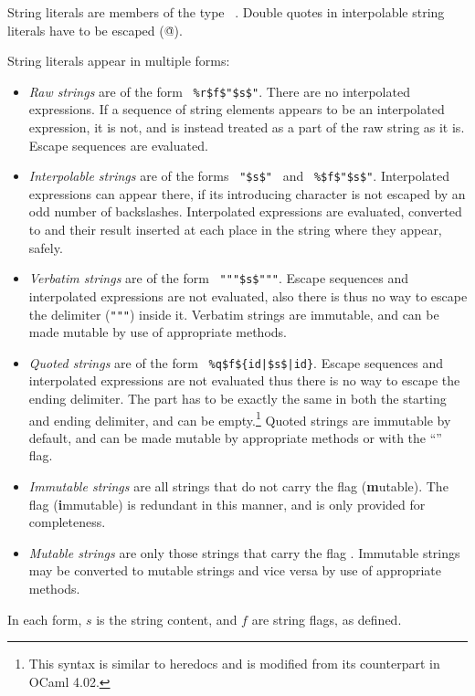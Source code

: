 String literals are members of the type ~\lstinline@String@. Double quotes in interpolable string literals have to be escaped (\lstinline@\"@).

String literals appear in multiple forms:
\begin{itemize}
  \item {\em Raw strings} are of the form ~\lstinline!%r$f$"$s$"!. There are no interpolated expressions. If a sequence of string elements appears to be an interpolated expression, it is not, and is instead treated as a part of the raw string as it is. Escape sequences are evaluated. 
  \item {\em Interpolable strings} are of the forms ~\lstinline!"$s$"!~ and ~\lstinline!%$f$"$s$"!. Interpolated expressions can appear there, if its introducing character is not escaped by an odd number of backslashes. Interpolated expressions are evaluated, converted to  and their result inserted at each place in the string where they appear, safely. 
  \item {\em Verbatim strings} are of the form ~\lstinline!"""$s$"""!. Escape sequences and interpolated expressions are not evaluated, also there is thus no way to escape the delimiter (\lstinline!"""!) inside it. Verbatim strings are immutable, and can be made mutable by use of appropriate methods. 
  \item {\em Quoted strings} are of the form ~\lstinline!%q$f${id|$s$|id}!. Escape sequences and interpolated expressions are not evaluated thus there is no way to escape the ending delimiter. The  part has to be exactly the same in both the starting and ending delimiter, and can be empty.\footnote{This syntax is similar to heredocs and is modified from its counterpart in OCaml 4.02.} Quoted strings are immutable by default, and can be made mutable by appropriate methods or with the ``'' flag.
  \item {\em Immutable strings} are all strings that do not carry the flag  (\textbf{m}utable). The flag  (\textbf{i}mmutable) is redundant in this manner, and is only provided for completeness. 
  \item {\em Mutable strings} are only those strings that carry the flag . Immutable strings may be converted to mutable strings and vice versa by use of appropriate methods. 
\end{itemize}

In each form, $s$ is the string content, and $f$ are string flags, as defined. 

